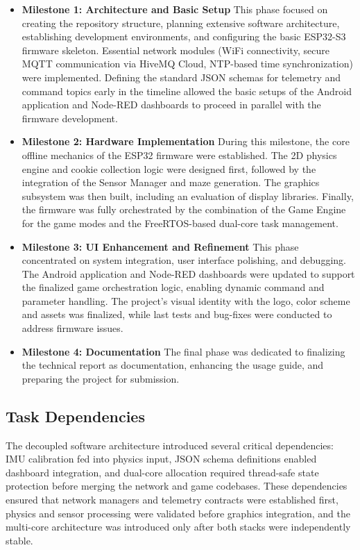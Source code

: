 \begin{itemize}
    \item \textbf{Milestone 1: Architecture and Basic Setup}
          This phase focused on creating the repository structure, planning extensive software architecture, establishing development environments, and configuring the basic ESP32-S3 firmware skeleton. Essential network modules (WiFi connectivity, secure MQTT communication via HiveMQ Cloud, NTP-based time synchronization) were implemented. Defining the standard JSON schemas for telemetry and command topics early in the timeline allowed the basic setups of the Android application and Node-RED dashboards to proceed in parallel with the firmware development.

    \item \textbf{Milestone 2: Hardware Implementation}
          During this milestone, the core offline mechanics of the ESP32 firmware were established. The 2D physics engine and cookie collection logic were designed first, followed by the integration of the Sensor Manager and maze generation. The graphics subsystem was then built, including an evaluation of display libraries. Finally, the firmware was fully orchestrated by the combination of the Game Engine for the game modes and the FreeRTOS-based dual-core task management.

    \item \textbf{Milestone 3: UI Enhancement and Refinement}
          This phase concentrated on system integration, user interface polishing, and debugging. The Android application and Node-RED dashboards were updated to support the finalized game orchestration logic, enabling dynamic command and parameter handling. The project's visual identity with the logo, color scheme and assets was finalized, while last tests and bug-fixes were conducted to address firmware issues.

    \item \textbf{Milestone 4: Documentation}
          The final phase was dedicated to finalizing the technical report as documentation, enhancing the usage guide, and preparing the project for submission.
\end{itemize}

\subsection{Task Dependencies}
\label{subsec:task_dependencies}

The decoupled software architecture introduced several critical dependencies:
IMU calibration fed into physics input, JSON schema definitions enabled dashboard integration, and dual-core allocation required thread-safe state protection before merging the network and game codebases. These dependencies ensured that network managers and telemetry contracts were established first, physics and sensor processing were validated before graphics integration, and the multi-core architecture was introduced only after both stacks were independently stable.

